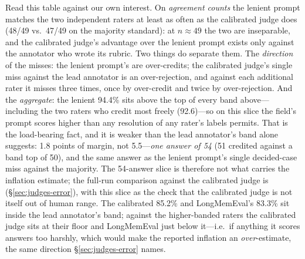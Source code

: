 \documentclass[11pt]{article}
\begin{document}
\begin{table}[t]
\vspace{3pt}
{\footnotesize Read this table against our own interest. On \emph{agreement counts} the lenient prompt matches the two independent raters at least as often as the calibrated judge does (48/49 vs.\ 47/49 on the majority standard): at $n{\approx}49$ the two are inseparable, and the calibrated judge's advantage over the lenient prompt exists only against the annotator who wrote its rubric. Two things do separate them. The \emph{direction} of the misses: the lenient prompt's are over-credits; the calibrated judge's single miss against the lead annotator is an over-rejection, and against each additional rater it misses three times, once by over-credit and twice by over-rejection. And the \emph{aggregate}: the lenient 94.4\% sits above the top of every band above---including the two raters who credit most freely (92.6)---so on this slice the field's prompt scores higher than any resolution of any rater's labels permits. That is the load-bearing fact, and it is weaker than the lead annotator's band alone suggests: 1.8 points of margin, not 5.5---\emph{one answer of 54} (51 credited against a band top of 50), and the same answer as the lenient prompt's single decided-case miss against the majority. The 54-answer slice is therefore not what carries the inflation estimate; the full-run comparison against the calibrated judge is (\S\ref{sec:judges-error}), with this slice as the check that the calibrated judge is not itself out of human range. The calibrated 85.2\% and LongMemEval's 83.3\% sit inside the lead annotator's band; against the higher-banded raters the calibrated judge sits at their floor and LongMemEval just below it---i.e.\ if anything it scores answers too harshly, which would make the reported inflation an \emph{over}-estimate, the same direction \S\ref{sec:judges-error} names.}
\end{table}
\end{document}
